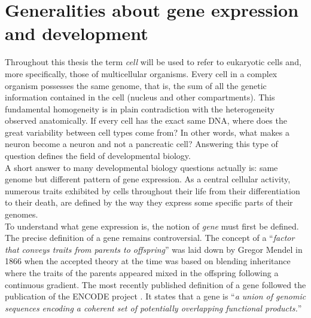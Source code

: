 \section{Generalities about gene expression and development}\label{sec:gene_expression_background}     
       
     Throughout this thesis the term \emph{cell} will be used to refer to eukaryotic cells and, more specifically, those of multicellular organisms. Every cell in a complex organism possesses the same genome, that is, the sum of all the genetic information contained in the cell (nucleus and other compartments). This fundamental homogeneity is in plain contradiction with the heterogeneity observed anatomically. If every cell has the exact same DNA, where does the great variability between cell types come from? In other words, what makes a neuron become a neuron and not a pancreatic cell? Answering this type of question defines the field of developmental biology.\\
     
     A short answer to many developmental biology questions actually is: same genome but different pattern of gene expression. As a central cellular activity, numerous traits exhibited by cells throughout their life from their differentiation to their death, are defined by the way they express some specific parts of their genomes.\\

     To understand what gene expression is, the notion of \emph{gene} must first be defined. The precise definition of a gene remains controversial. The concept of a ``\emph{factor that conveys traits from parents to offspring}'' was laid down by Gregor Mendel in 1866 \citep{mendel66} when the accepted theory at the time was based on blending inheritance where the traits of the parents appeared mixed in the offspring following a continuous gradient. The most recently published definition of a gene followed the publication of the ENCODE project \citep{feingold04}. It states that a gene is ``\emph{a union of genomic sequences encoding a coherent set of potentially overlapping functional products.}''\\

